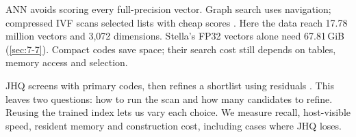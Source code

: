 ANN avoids scoring every full-precision vector. Graph search uses navigation; compressed IVF scans selected lists with cheap scores \cite{cagra,johnson_gpu,ivfrabitq}. Here the data reach 17.78 million vectors and 3,072 dimensions. Stella's FP32 vectors alone need 67.81\,GiB (\cref{sec:7-7}). Compact codes save space; their search cost still depends on tables, memory access and selection.

JHQ screens with primary codes, then refines a shortlist using residuals \cite{jhq}. This leaves two questions: how to run the scan and how many candidates to refine. Reusing the trained index lets us vary each choice. We measure recall, host-visible speed, resident memory and construction cost, including cases where JHQ loses.